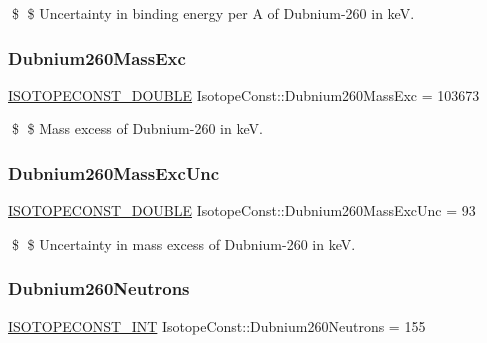 \$ \$ Uncertainty in binding energy per A of Dubnium-\/260 in keV. \mbox{\label{group___isotope_const-_dubnium-_db260_ga87e2d7eb7bba465c5e6235e0dfe5fc5d}} 
\subsubsection{\texorpdfstring{Dubnium260\+Mass\+Exc}{Dubnium260MassExc}}
{\footnotesize\ttfamily \mbox{\hyperlink{group___isotope_const-_macros_ga8f45a7272ce02c0b4c65c44636ed719a}{I\+S\+O\+T\+O\+P\+E\+C\+O\+N\+S\+T\+\_\+\+D\+O\+U\+B\+LE}} Isotope\+Const\+::\+Dubnium260\+Mass\+Exc = 103673}

\$ \$ Mass excess of Dubnium-\/260 in keV. \mbox{\label{group___isotope_const-_dubnium-_db260_ga82e8904c39689438874906e7fad39088}} 
\subsubsection{\texorpdfstring{Dubnium260\+Mass\+Exc\+Unc}{Dubnium260MassExcUnc}}
{\footnotesize\ttfamily \mbox{\hyperlink{group___isotope_const-_macros_ga8f45a7272ce02c0b4c65c44636ed719a}{I\+S\+O\+T\+O\+P\+E\+C\+O\+N\+S\+T\+\_\+\+D\+O\+U\+B\+LE}} Isotope\+Const\+::\+Dubnium260\+Mass\+Exc\+Unc = 93}

\$ \$ Uncertainty in mass excess of Dubnium-\/260 in keV. \mbox{\label{group___isotope_const-_dubnium-_db260_ga373af2ff0dc35639a60bab9f4146373a}} 
\subsubsection{\texorpdfstring{Dubnium260\+Neutrons}{Dubnium260Neutrons}}
{\footnotesize\ttfamily \mbox{\hyperlink{group___isotope_const-_macros_ga5f18360b3e99483a35c32d789e62621c}{I\+S\+O\+T\+O\+P\+E\+C\+O\+N\+S\+T\+\_\+\+I\+NT}} Isotope\+Const\+::\+Dubnium260\+Neutrons = 155}

